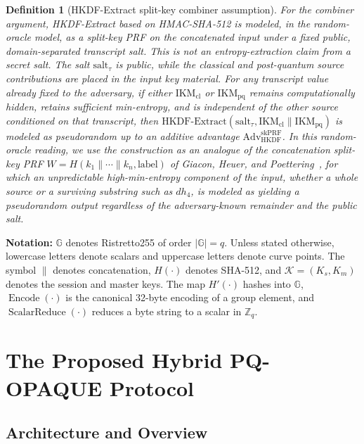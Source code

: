 \documentclass[preprint,12pt]{elsarticle}
\newtheorem{definition}{Definition}[section]
\theoremstyle{remark}
\begin{document}
\begin{definition}[HKDF-Extract split-key combiner assumption]
For the combiner argument, HKDF-Extract based on HMAC-SHA-512 is modeled, in
the random-oracle model, as
a split-key PRF on the concatenated input under a fixed public,
domain-separated transcript salt. This is not an entropy-extraction claim
from a secret salt. The salt $\mathrm{salt}_{\tau}$ is public, while the
classical and post-quantum source contributions are placed in the input key
material. For any transcript value already fixed to the adversary, if
either $\mathrm{IKM}_{\mathrm{cl}}$ or $\mathrm{IKM}_{\mathrm{pq}}$ remains
computationally hidden, retains sufficient min-entropy, and is independent
of the other source conditioned on that transcript, then
$\mathrm{HKDF\text{-}Extract}(\mathrm{salt}_{\tau},
\mathrm{IKM}_{\mathrm{cl}}\|\mathrm{IKM}_{\mathrm{pq}})$ is modeled as
pseudorandom up to an additive advantage
$\mathrm{Adv}_{\mathrm{HKDF}}^{\mathrm{skPRF}}$. In this random-oracle reading,
we use the construction as an analogue of the concatenation split-key PRF
$W = H(k_1\|\cdots\|k_n,\mathrm{label})$ of Giacon, Heuer, and
Poettering~\cite{giacon2018}, for which an unpredictable high-min-entropy
component of the input, whether a whole source or a surviving substring such as
$dh_4$, is modeled as yielding a pseudorandom output regardless of the adversary-known remainder
and the public salt.
\end{definition}

\textbf{Notation:} $\mathbb{G}$ denotes Ristretto255 of order
$|\mathbb{G}| = q$. Unless stated otherwise, lowercase letters denote scalars and uppercase letters
denote curve points. The symbol $\|$ denotes concatenation, $H(\cdot)$ denotes
SHA-512, and $\mathcal{K} = (K_s, K_m)$ denotes the session and master
keys. The map $H'(\cdot)$ hashes into $\mathbb{G}$, $\operatorname{Encode}(\cdot)$
is the canonical 32-byte encoding of a group element, and
$\operatorname{ScalarReduce}(\cdot)$ reduces a byte string to a scalar in
$\mathbb{Z}_q$.

\section{The Proposed Hybrid PQ-OPAQUE Protocol}

\subsection{Architecture and Overview}
\end{document}
